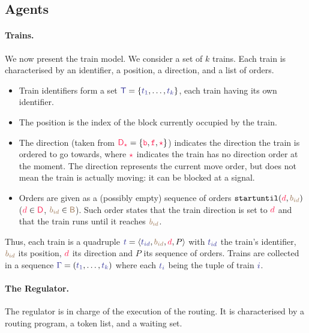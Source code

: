 \documentclass[runningheads]{llncs}
\newcommand{\directions}{\dirFmt{\mathsf{D}}}
\newcommand{\forward}{\ensuremath{\mathtt{f}}}
\newcommand{\backward}{\ensuremath{\mathtt{b}}\xspace}
\newcommand{\dirFmt}[1]{{\color{dircolor} #1}}
\newcommand{\dirForward}{\ensuremath{\dirFmt{\forward}}\xspace}
\newcommand{\dirBackward}{\ensuremath{\dirFmt{\backward}}\xspace}
\newcommand{\dirStop}{\ensuremath{\dirFmt{\star}}\xspace}
\newcommand{\posFmt}[1]{{\color{poscolor}{#1}}}
\newcommand{\blocks}{{\posFmt{\mathsf{B}}}}
\newcommand{\bid}[1]{\ensuremath{\posFmt{b_{#1}}}}
\newcommand{\trainFmt}[1]{{\color{traincolor} #1}}
\newcommand{\trainTuple}[4]{\langle \trainFmt{#1}, \posFmt{#2}, \dirFmt{#3}, #4 \rangle}
\newcommand{\trainSeq}{\trainFmt{\Gamma\xspace}}
\newcommand{\trains}{{\trainFmt{\mathsf{T}}}}
\newcommand{\tid}[1]{\ensuremath{\trainFmt{t_{#1}}}}
\newcommand{\su}[2]{{\mbox{$\mathtt{startuntil}(\dirFmt{#1}, \posFmt{#2})$}}\xspace}
\begin{document}
\subsection{Agents}
\paragraph{Trains.}
We now present the train model. We consider a set of $k$ trains. 
Each train is characterised by an identifier, a position, a direction, and a list of orders.
\begin{itemize}
	\item Train identifiers form a set  $\trains = \{\tid{1}, \ldots, \tid{k}\}$, each train having its own identifier.
	\item The position is the index of the block currently occupied by the train.
	\item The direction (taken from $\directions_\dirStop = \{\dirBackward, \dirForward, \dirStop\}$) indicates the direction the train is ordered to go towards, where \dirStop indicates the train has no direction order at the moment. The direction represents the current move order, but does not mean the train is actually moving: it can be blocked at a signal.
	\item Orders are given as a (possibly empty) sequence of orders $\su{d}{\bid{id}}$ ($\dirFmt{d} \in \directions$, $\bid{id} \in \blocks$). Such order states that the train direction is set to $\dirFmt{d}$ and that the train runs until it reaches $\bid{id}$.
\end{itemize}

Thus, each train is a quadruple $\trainFmt{t} = \trainTuple{\tid{id}}{\bid{id}}{d}{P}$ with $\tid{id}$ the train's identifier, $\bid{id}$ its position, $\dirFmt{d}$ its direction and $P$ its sequence of orders. Trains are collected in a sequence $\trainSeq = (\trainFmt{t_1}, \ldots, \trainFmt{t_k})$ where each $\trainFmt{t_i}$ being the tuple of train $\trainFmt{i}$. 


\paragraph{The Regulator.}
The regulator is in charge of the execution of the routing.
It is characterised by a routing program, a token list, and a waiting set.
\end{document}
